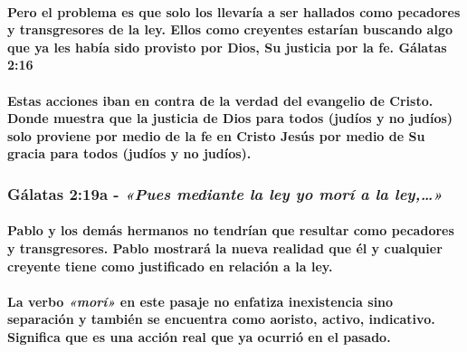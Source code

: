 \documentclass[11a pt,twoside]{article}
\newcommand{\scripture}[1]{%
  {\fontsize{12pt}{16pt}\selectfont\ScriptureFont\itshape #1}%
}
\let\oldsubsubsection\subsubsection
\renewcommand{\subsubsection}{\needspace{4\baselineskip}\oldsubsubsection}
\let\oldparagraph\paragraph
\renewcommand{\paragraph}{\needspace{3\baselineskip}\oldparagraph}
\begin{document}
\paragraph{Pero el problema es que solo los llevaría a ser hallados como
pecadores y transgresores de la ley. Ellos como creyentes estarían
buscando algo que ya les había sido provisto por Dios, Su justicia por
la fe. Gálatas
2:16}\label{pero-el-problema-es-que-solo-los-llevaruxeda-a-ser-hallados-como-pecadores-y-transgresores-de-la-ley.-ellos-como-creyentes-estaruxedan-buscando-algo-que-ya-les-habuxeda-sido-provisto-por-dios-su-justicia-por-la-fe.-guxe1latas-216}

\paragraph{Estas acciones iban en contra de la verdad del evangelio de
Cristo. Donde muestra que la justicia de Dios para todos (judíos y no
judíos) solo proviene por medio de la fe en Cristo Jesús por medio de Su
gracia para todos (judíos y no
judíos).}\label{estas-acciones-iban-en-contra-de-la-verdad-del-evangelio-de-cristo.-donde-muestra-que-la-justicia-de-dios-para-todos-juduxedos-y-no-juduxedos-solo-proviene-por-medio-de-la-fe-en-cristo-jesuxfas-por-medio-de-su-gracia-para-todos-juduxedos-y-no-juduxedos.}

\subsubsection{\texorpdfstring{Gálatas 2:19a -
\scripture{«Pues mediante la ley yo morí a la ley,…»}}{Gálatas 2:19a - }}\label{guxe1latas-219a---pues-mediante-la-ley-yo-moruxed-a-la-ley}

\paragraph{Pablo y los demás hermanos no tendrían que resultar como
pecadores y transgresores. Pablo mostrará la nueva realidad que él y
cualquier creyente tiene como justificado en relación a la
ley.}\label{pablo-y-los-demuxe1s-hermanos-no-tendruxedan-que-resultar-como-pecadores-y-transgresores.-pablo-mostraruxe1-la-nueva-realidad-que-uxe9l-y-cualquier-creyente-tiene-como-justificado-en-relaciuxf3n-a-la-ley.}

\paragraph{\texorpdfstring{La verbo \scripture{«morí»} en este pasaje no
enfatiza inexistencia sino separación y también se encuentra como
aoristo, activo, indicativo. Significa que es una acción real que ya
ocurrió en el
pasado.}{La verbo  en este pasaje no enfatiza inexistencia sino separación y también se encuentra como aoristo, activo, indicativo. Significa que es una acción real que ya ocurrió en el pasado.}}\label{la-verbo-moruxed-en-este-pasaje-no-enfatiza-inexistencia-sino-separaciuxf3n-y-tambiuxe9n-se-encuentra-como-aoristo-activo-indicativo.-significa-que-es-una-acciuxf3n-real-que-ya-ocurriuxf3-en-el-pasado.}
\end{document}
